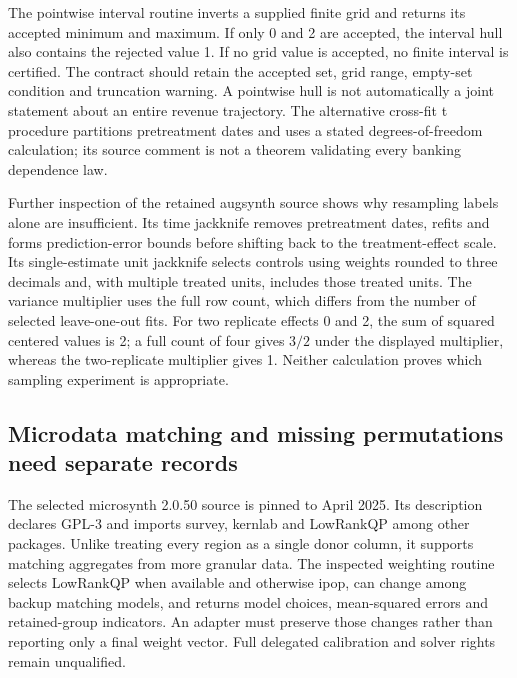 The pointwise interval routine inverts a supplied finite grid and returns
its accepted minimum and maximum. If only 0 and 2 are accepted, the interval
hull also contains the rejected value 1. If no grid value is accepted, no
finite interval is certified. The contract should retain the accepted set,
grid range, empty-set condition and truncation warning. A pointwise hull is
not automatically a joint statement about an entire revenue trajectory.
The alternative cross-fit t procedure partitions pretreatment dates and
uses a stated degrees-of-freedom calculation; its source comment is not a
theorem validating every banking dependence law.~\citep{exec25_synthr_scinference,
exec25_synthr_choice}

Further inspection of the retained augsynth source shows why resampling
labels alone are insufficient. Its time jackknife removes pretreatment
dates, refits and forms prediction-error bounds before shifting back to
the treatment-effect scale. Its single-estimate unit jackknife selects
controls using weights rounded to three decimals and, with multiple treated
units, includes those treated units. The variance multiplier uses the full
row count, which differs from the number of selected leave-one-out fits.
For two replicate effects 0 and 2, the sum of squared centered values is 2;
a full count of four gives $3/2$ under the displayed multiplier, whereas
the two-replicate multiplier gives 1. Neither calculation proves which
sampling experiment is appropriate.~\citep{exec25_synthr_auginference,
exec25_synthr_choice}

\subsection{Microdata matching and missing permutations need separate records}
The selected microsynth 2.0.50 source is pinned to April 2025. Its description
declares GPL-3 and imports survey, kernlab and LowRankQP among other packages.
Unlike treating every region as a single donor column, it supports matching
aggregates from more granular data. The inspected weighting routine selects
LowRankQP when available and otherwise ipop, can change among backup matching
models, and returns model choices, mean-squared errors and retained-group
indicators. An adapter must preserve those changes rather than reporting
only a final weight vector. Full delegated calibration and solver rights
remain unqualified.~\citep{exec25_synthr_microsynth}


